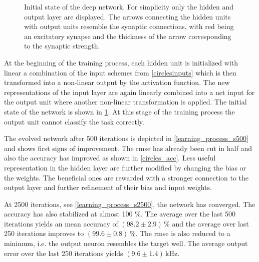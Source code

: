 \begin{figure}
	
	\caption[Initial state of the deep network.]{Initial state of the deep network. For simplicity only the hidden and output layer are displayed. The arrows connecting the hidden units with output units resemble the synaptic connections, with red being an excitatory synapse and the thickness of the arrow corresponding to the synaptic strength.}
	\label{learning_process_s5}
\end{figure}

At the beginning of the training process, each hidden unit is initialized with linear a combination of the input schemes from \cref{circlesinputs} which is then transformed into a non-linear output by the activation function. The new representations of the input layer are again linearly combined into a net input for the output unit where another non-linear transformation is applied. The initial state of the network is shown in \cref{learning_process_s5}. At this stage of the training process the output unit cannot classify the task correctly. 

%	

The evolved network after 500 iterations is depicted in \cref{learning_process_s500} and shows first signs of improvement. The \gls{rmse} has already been cut in half and also the accuracy has improved as shown in \cref{circles_acc}. Less useful representation in the hidden layer are further modified by changing the bias or the weights. The beneficial ones are rewarded with a stronger connection to the output layer and further refinement of their bias and input weights.

At 2500 iterations, see \cref{learning_process_s2500}, the network has converged. The accuracy has also stabilized at almost 100 \%. The average over the last 500 iterations yields an mean accuracy of $(98.2 \pm 2.9)\,\%$ and the average over last 250 iterations improves to  $(99.6 \pm 0.8)\,\%$. The \gls{rmse} is also reduced to a minimum, i.e. the output neuron resembles the target well. The average output error over the last 250 iterations yields $(9.6 \pm 1.4)\,\si{\kilo \Hz}$.

